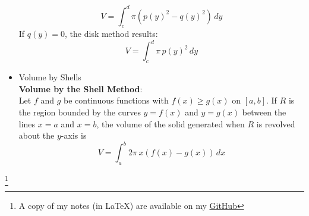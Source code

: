 \documentclass{article}
\newcommand\blfootnote[1]{
    \begingroup
    \renewcommand\thefootnote{}\footnote{#1}
    \addtocounter{footnote}{-1}
    \endgroup
}
\begin{document}
\begin{itemize}
        $$V = \int_c^d{\pi\left(p(y)^2 - q(y)^2\right)\,dy}$$
        If $q(y) = 0$, the disk method results:
        $$V = \int_c^d{\pi\,p(y)^2\,dy}$$
    \item Volume by Shells \\
        \textbf{Volume by the Shell Method}: \\
        Let $f$ and $g$ be continuous functions with $f(x) \geq g(x)$ on $[a,b]$. If $R$ is the region bounded by the curves $y = f(x)$ and $y = g(x)$ between the lines $x = a$ and $x = b$, the volume of the solid generated when $R$ is revolved about the $y$-axis is
        $$V = \int_a^b{2\pi\,x\left(f(x) - g(x)\right)\,dx}$$
\end{itemize}

\blfootnote{A copy of my notes (in \LaTeX) are available on my \href{https://github.com/onlinechronically/MATH-211}{GitHub}}
\end{document}
